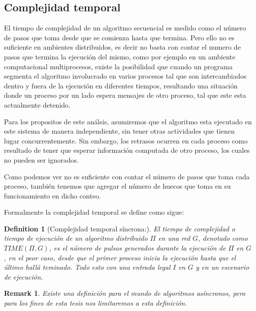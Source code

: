 \documentclass[10pt]{report}
\newtheorem*{remark}{Remark}
\newtheorem{definition}{Definition}
\begin{document}
    \subsection{Complejidad temporal}\label{subsec:complejidad-temporal}
    El tiempo de complejidad de un algoritmo secuencial es medido como el número de pasos que toma desde que se comienza
    hasta que termina.
    Pero ello no es suficiente en ambientes distribuidos, es decir no basta con contar el numero de pasos que termina la
    ejecución del mismo, como por ejemplo en un ambiente computacional multiprocesos, existe la posibilidad que cuando un
    programa segmenta el algoritmo involucrado en varios procesos tal que son intercambiados dentro y fuera de la ejecución
    en diferentes tiempos, resultando una situación donde un proceso por un lado espera mensajes de otro proceso, tal que
    este esta actualmente detenido.\newline

    Para los propositos de este análsis, asumiremos que el algoritmo esta ejecutado en este sistema de manera independiente,
    sin tener otras actividades que tienen lugar concurrentemente.
    Sin embargo, los retrasos ocurren en cada proceso como resultado de tener que esperar información computada de otro
    proceso, los cuales no pueden ser ignorados.\newline

    Como podemos ver no es suficiente con contar el número de pasos que toma cada proceso, también tenemos que agregar
    el número de huecos que toma en su funcionamiento en dicho conteo.
    \newpage

    Formalmente la complejidad temporal se define como sigue:
    \begin{definition}
        [Complejidad temporal síncrona:] El tiempo de complejidad o tiempo de ejecución de un
        algoritmo distribuido $\Pi$ en una red $G$, denotado como $TIME(\Pi,G)$, es el número de pulsos generados
        durante la ejecución de $\Pi$ en $G$, en el peor caso, desde que el primer proceso inicia la ejecución
        hasta que el último hallá teminado.
        Todo esto con una entrada legal $I$ en $G$ y en un escenario de ejecución.
    \end{definition}
    \begin{remark}
        Existe una definición para el mundo de algoritmos asíncronos, pero para los fines
    de esta tesis nos limitaremos a esta definición.
    \end{remark}
\end{document}
